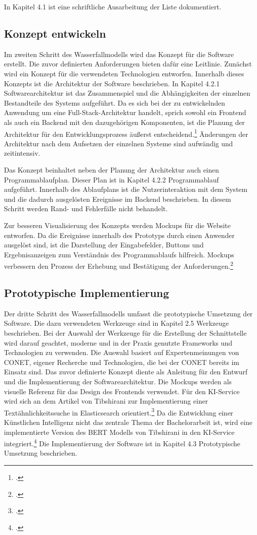 In Kapitel 4.1 ist eine schriftliche Ausarbeitung der Liste dokumentiert.

\subsection{Konzept entwickeln}
Im zweiten Schritt des Wasserfallmodells wird das Konzept für die Software erstellt. Die zuvor definierten Anforderungen bieten dafür eine Leitlinie. Zunächst wird ein Konzept für die verwendeten Technologien entworfen. Innerhalb dieses Konzepts ist die Architektur der Software beschrieben. In Kapitel 4.2.1 \glqq Softwarearchitektur\grqq{} ist das Zusammenspiel und die Abhängigkeiten der einzelnen Bestandteile des Systems aufgeführt. Da es sich bei der zu entwickelnden Anwendung um eine Full-Stack-Architektur handelt, sprich sowohl ein Frontend als auch ein Backend mit den dazugehörigen Komponenten, ist die Planung der Architektur für den Entwicklungsprozess äußerst entscheidend.\footcite{taivalsaari2021full} Änderungen der Architektur nach dem Aufsetzen der einzelnen Systeme sind aufwändig und zeitintensiv.

Das Konzept beinhaltet neben der Planung der Architektur auch einen Programmablaufplan. Dieser Plan ist in Kapitel 4.2.2 \glqq Programmablauf\grqq{} aufgeführt. Innerhalb des Ablaufplans ist die Nutzerinteraktion mit dem System und die dadurch ausgelösten Ereignisse im Backend beschrieben. In diesem Schritt werden Rand- und Fehlerfälle nicht behandelt.

Zur besseren Visualisierung des Konzepts werden Mockups für die Website entworfen. Da die Ereignisse innerhalb des Prototyps durch einen Anwender ausgelöst sind, ist die Darstellung der Eingabefelder, Buttons und Ergebnisanzeigen zum Verständnis des Programmablaufs hilfreich. Mockups verbessern den Prozess der Erhebung und Bestätigung der Anforderungen.\footcite{rivero2010mockups}

\subsection{Prototypische Implementierung}
Der dritte Schritt des Wasserfallmodells umfasst die prototypische Umsetzung der Software. Die dazu verwendeten Werkzeuge sind in Kapitel 2.5 \glqq Werkzeuge\grqq{} beschrieben. Bei der Auswahl der Werkzeuge für die Erstellung der Schnittstelle wird darauf geachtet, moderne und in der Praxis genutzte Frameworks und Technologien zu verwenden. Die Auswahl basiert auf Expertenmeinungen von CONET, eigener Recherche und Technologien, die bei der CONET bereits im Einsatz sind. Das zuvor definierte Konzept diente als Anleitung für den Entwurf und die Implementierung der Softwarearchitektur. Die Mockups werden als visuelle Referenz für das Design des Frontends verwendet. Für den KI-Service wird sich an dem Artikel von Tibshirani zur Implementierung einer Textähnlichkeitssuche in Elasticsearch orientiert.\footcite{tibshirani2019ki} Da die Entwicklung einer Künstlichen Intelligenz nicht das zentrale Thema der Bachelorarbeit ist, wird eine implementierte Version des BERT Modells von Tibshirani in den KI-Service integriert.\footcite{tibshirani2020github} Die Implementierung der Software ist in Kapitel 4.3 \glqq Prototypische Umsetzung\grqq{} beschrieben.

